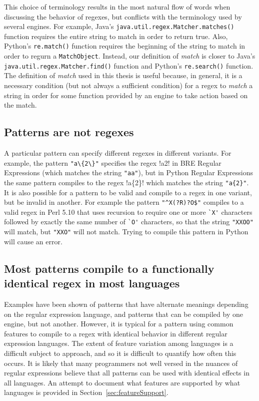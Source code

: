 This choice of terminology results in the most natural flow of words when discussing the behavior of regexes, but conflicts with the terminology used by several engines.  For example, Java's {\tt java.util.regex.Matcher.matches()} function requires the entire string to match in order to return true.  Also, Python's {\tt re.match()} function requires the beginning of the string to match in order to regurn a {\tt MatchObject}.  Instead, our definition of \emph{match} is closer to Java's {\tt java.util.regex.Matcher.find()} function and Python's {\tt re.search()} function.  The definition of \emph{match} used in this thesis is useful because, in general, it is a necessary condition (but not always a sufficient condition) for a regex to \emph{match} a string in order for some function provided by an engine to take action based on the match.

\subsection{Patterns are not regexes}
A particular pattern can specify different regexes in different variants.  For example, the pattern \verb!"a\{2\}"! specifies the regex \cverb!a{2}! in BRE Regular Expressions (which matches the string \verb!"aa"!), but in Python Regular Expressions the same pattern compiles to the regex \cverb!a\{2\}! which matches the string \verb!"a{2}"!.
It is also possible for a pattern to be valid and compile to a regex in one variant, but be invalid in another.  For example the pattern \verb!"^X(?R)?O$"! compiles to a valid regex in Perl 5.10 that uses recursion to require one or more \verb!`X'! characters followed by exactly the same number of \verb!`O'! characters, so that the string \verb!"XXOO"! will match, but \verb!"XXO"! will not match.  Trying to compile this pattern in Python will cause an error.

\subsection{Most patterns compile to a functionally identical regex in most languages}
\label{sec:usuallyOk}
Examples have been shown of patterns that have alternate meanings depending on the regular expression language, and patterns that can be compiled by one engine, but not another.  However, it is typical for a pattern using common features to compile to a regex with identical behavior in different regular expression languages.  The extent of feature variation among languages is a difficult subject to approach, and so it is difficult to quantify how often this occurs.  It is likely that many programmers not well versed in the nuances of regular expressions believe that all patterns can be used with identical effects in all languages.  An attempt to document what features are supported by what languages is provided in Section~\ref{sec:featureSupport}.

